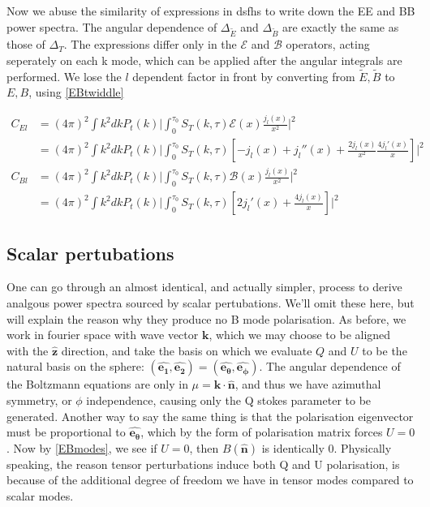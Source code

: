 \documentclass[a4paper,11pt]{article}
\renewcommand{\v}[1]{\mathbf{#1}}
\newcommand{\unit}[1]{\hat{\v{#1}}}
\begin{document}
Now we abuse the similarity of expressions in dsfhs to write down the EE and BB power spectra. The angular dependence of $\Delta_{\tilde{E}}$ and $\Delta_{\tilde{B}}$ are exactly the same as those of $\Delta_T$. The expressions differ only in the $\mathcal{E}$ and $\mathcal{B}$ operators, acting seperately on each k mode, which can be applied after the angular integrals are performed. We lose the $l$ dependent factor in front by converting from $\tilde{E}, \tilde{B}$ to $E,B$, using \ref{EBtwiddle}


\begin{align}
C_{El} &= (4\pi)^2 \int k^2 dk P_t(k) \bigg|  \int_0^{\tau_0} S_T(k,\tau)\mathcal{E}(x)\frac{j_l(x)}{x^2} \bigg|^2\\
&= (4\pi)^2\int k^2 dk P_t(k) \bigg|  \int_0^{\tau_0} S_T(k,\tau)[-j_l(x) +j_l''(x)+\frac{2j_l(x)}{x^2} \frac{4j_l'(x)}{x}]\bigg|^2\\
C_{Bl} &= (4\pi)^2 \int k^2 dk P_t(k) \bigg|  \int_0^{\tau_0} S_T(k,\tau)\mathcal{B}(x)\frac{j_l(x)}{x^2} \bigg|^2\\
&= (4\pi)^2\int k^2 dk P_t(k) \bigg|  \int_0^{\tau_0} S_T(k,\tau)[2j_l'(x)+\frac{4j_l(x)}{x}]\bigg|^2
\end{align}


\subsection{Scalar pertubations}

One can go through an almost identical, and actually simpler, process to derive analgous power spectra sourced by scalar pertubations. We'll omit these here, but will explain the reason why they produce no B mode polarisation. As before, we work in fourier space with wave vector $\v{k}$, which we may choose to be aligned with the $\unit{z}$ direction, and take the basis on which we evaluate $Q$ and $U$ to be the natural basis on the sphere: $(\unit{e_1}, \unit{e_2}) = (\unit{e_\theta}, \unit{e_\phi})$. The angular dependence of the Boltzmann equations are only in $\mu=\v{k}\cdot\unit{n}$, and thus we have azimuthal symmetry, or $\phi$ independence, causing only the Q stokes parameter to be generated. Another way to say the same thing is that the polarisation eigenvector must be proportional to $\unit{e_\theta}$, which by the form of polarisation matrix forces $U=0$. Now by \ref{EBmodes}, we see if $U=0$, then $B(\unit{n})$ is identically 0. Physically speaking, the reason tensor perturbations induce both Q and U polarisation, is because of the additional degree of freedom we have in tensor modes compared to scalar modes.
\end{document}
